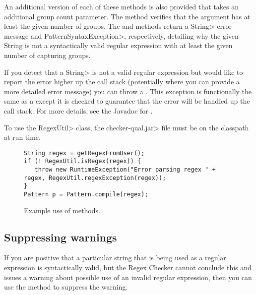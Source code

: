 An additional version of each of these methods is also provided that takes
an additional group count parameter. The
 method
verifies that the argument has at least the given number of groups. The
 and
methods return a \<String> error message and \<Pattern\-Syntax\-Exception>,
respectively, detailing why the given String is not a syntactically valid
regular expression with at least the given number of capturing groups.

\begin{sloppypar}
If you detect that a \<String> is not a valid regular expression but would like
to report the error higher up the call stack (potentially where you can
provide a more detailed error message) you can throw a
. This exception is
functionally the same as a
except it is checked to guarantee that the error will be handled up the
call stack.  For more details, see the Javadoc for
.
\end{sloppypar}

To use the \<RegexUtil> class, the \<checker-qual.jar> file
must be on the classpath at run time.

\begin{figure}
\begin{smaller}
\begin{Verbatim}
String regex = getRegexFromUser();
if (! RegexUtil.isRegex(regex)) {
   throw new RuntimeException("Error parsing regex " + regex, RegexUtil.regexException(regex));
}
Pattern p = Pattern.compile(regex);
\end{Verbatim}
\end{smaller}
\caption{Example use of  methods.}
\label{fig-regex-util-example}
\end{figure}

\subsection{Suppressing warnings\label{regex-suppressing-warnings}}

If you are positive that a particular string that is being used as a
regular expression is syntactically valid, but the Regex Checker cannot
conclude this and issues a warning about possible use of an invalid regular
expression, then you can use the
 method to suppress the
warning.

